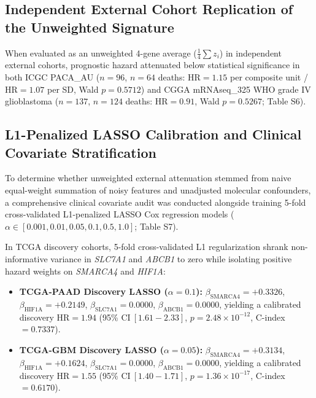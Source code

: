 \documentclass[11pt,a4paper]{article}
\begin{document}
\subsection{Independent External Cohort Replication of the Unweighted Signature}
When evaluated as an unweighted 4-gene average ($\frac{1}{4}\sum z_i$) in independent external cohorts, prognostic hazard attenuated below statistical significance in both ICGC PACA\_AU ($n = 96$, $n = 64$ deaths: $\text{HR} = 1.15$ per composite unit / $\text{HR} = 1.07$ per SD, Wald $p = 0.5712$) and CGGA mRNAseq\_325 WHO grade IV glioblastoma ($n = 137$, $n = 124$ deaths: $\text{HR} = 0.91$, Wald $p = 0.5267$; Table S6).

\subsection{L1-Penalized LASSO Calibration and Clinical Covariate Stratification}
To determine whether unweighted external attenuation stemmed from naive equal-weight summation of noisy features and unadjusted molecular confounders, a comprehensive clinical covariate audit was conducted alongside training 5-fold cross-validated L1-penalized LASSO Cox regression models ($\alpha \in [0.001, 0.01, 0.05, 0.1, 0.5, 1.0]$; Table S7).

In TCGA discovery cohorts, 5-fold cross-validated L1 regularization shrank non-informative variance in \textit{SLC7A1} and \textit{ABCB1} to zero while isolating positive hazard weights on \textit{SMARCA4} and \textit{HIF1A}:
\begin{itemize}
    \item \textbf{TCGA-PAAD Discovery LASSO ($\alpha = 0.1$):} $\beta_{\text{SMARCA4}} = +0.3326$, $\beta_{\text{HIF1A}} = +0.2149$, $\beta_{\text{SLC7A1}} = 0.0000$, $\beta_{\text{ABCB1}} = 0.0000$, yielding a calibrated discovery $\text{HR} = 1.94$ (95\% $\text{CI}~[1.61 - 2.33]$, $p = 2.48 \times 10^{-12}$, C-index $= 0.7337$).
    \item \textbf{TCGA-GBM Discovery LASSO ($\alpha = 0.05$):} $\beta_{\text{SMARCA4}} = +0.3134$, $\beta_{\text{HIF1A}} = +0.1624$, $\beta_{\text{SLC7A1}} = 0.0000$, $\beta_{\text{ABCB1}} = 0.0000$, yielding a calibrated discovery $\text{HR} = 1.55$ (95\% $\text{CI}~[1.40 - 1.71]$, $p = 1.36 \times 10^{-17}$, C-index $= 0.6170$).
\end{itemize}
\end{document}
